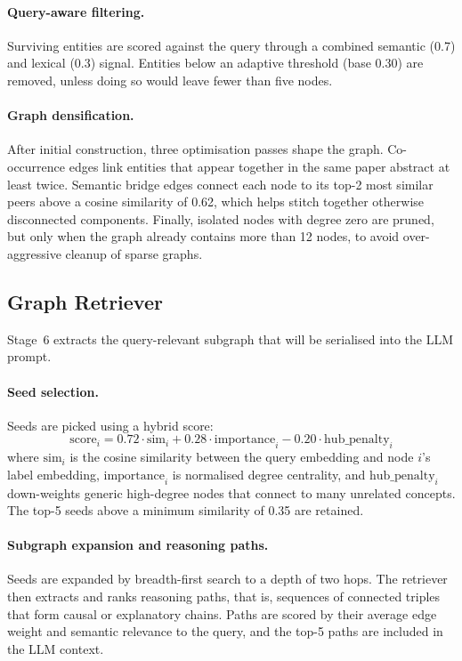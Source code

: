 \documentclass[11pt,a4paper]{article}
\begin{document}
\paragraph{Query-aware filtering.}
Surviving entities are scored against the query through a combined semantic
(0.7) and lexical (0.3) signal. Entities below an adaptive threshold (base
0.30) are removed, unless doing so would leave fewer than five nodes.

\paragraph{Graph densification.}
After initial construction, three optimisation passes shape the graph.
Co-occurrence edges link entities that appear together in the same paper
abstract at least twice. Semantic bridge edges connect each node to its top-2
most similar peers above a cosine similarity of 0.62, which helps stitch
together otherwise disconnected components. Finally, isolated nodes with
degree zero are pruned, but only when the graph already contains more than
12 nodes, to avoid over-aggressive cleanup of sparse graphs.

\subsection{Graph Retriever}

Stage~6 extracts the query-relevant subgraph that will be serialised into
the LLM prompt.

\paragraph{Seed selection.}
Seeds are picked using a hybrid score:
\[
  \text{score}_i = 0.72 \cdot \text{sim}_i + 0.28 \cdot \text{importance}_i
                   - 0.20 \cdot \text{hub\_penalty}_i
\]
where $\text{sim}_i$ is the cosine similarity between the query embedding and
node $i$'s label embedding, $\text{importance}_i$ is normalised degree
centrality, and $\text{hub\_penalty}_i$ down-weights generic high-degree
nodes that connect to many unrelated concepts. The top-5 seeds above a
minimum similarity of 0.35 are retained.

\paragraph{Subgraph expansion and reasoning paths.}
Seeds are expanded by breadth-first search to a depth of two hops. The
retriever then extracts and ranks reasoning paths, that is, sequences of
connected triples that form causal or explanatory chains. Paths are scored
by their average edge weight and semantic relevance to the query, and the
top-5 paths are included in the LLM context.
\end{document}
